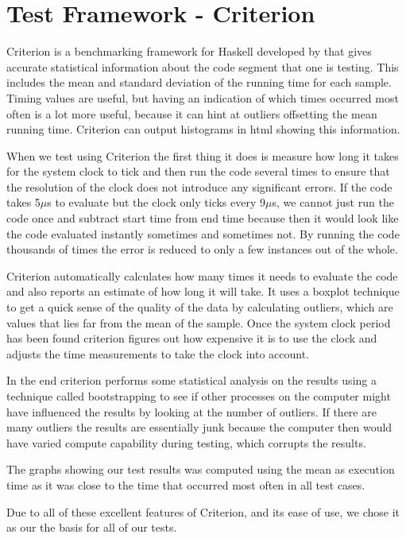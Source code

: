 
\section{Test Framework - Criterion}
Criterion \citep{criterion} is a benchmarking framework for Haskell developed by \citep{bos} that gives accurate statistical information about the code segment that one is testing. This includes the mean and standard deviation of the running time for each sample. Timing values are useful, but having an indication of which times occurred most often is a lot more useful, because it can hint at outliers offsetting the mean running time. Criterion can output histograms in html showing this information. 

When we test using Criterion the first thing it does is measure how long it takes for the system clock to tick and then run the code several times to ensure that the resolution of the clock does not introduce any significant errors. If the code takes 5$\mu$s to evaluate but the clock only ticks every 9$\mu$s, we cannot just run the code once and subtract start time from end time because then it would look like the code evaluated instantly sometimes and sometimes not. By running the code thousands of times the error is reduced to only a few instances out of the whole. 

Criterion automatically calculates how many times it needs to evaluate the code and also reports an estimate of how long it will take. It uses a boxplot technique to get a quick sense of the quality of the data by calculating outliers, which are values that lies far from the mean of the sample. Once the system clock period has been found criterion figures out how expensive it is to use the clock and adjusts the time measurements to take the clock into account. 

In the end criterion performs some statistical analysis on the results using a technique called bootstrapping to see if other processes on the computer might have influenced the results by looking at the number of outliers. If there are many outliers the results are essentially junk because the computer then would have varied compute capability during testing, which corrupts the results.  

The graphs showing our test results was computed using the mean as execution time as it was close to the time that occurred most often in all test cases.

Due to all of these excellent features of Criterion, and its ease of use, we chose it as our the basis for all of our tests. 